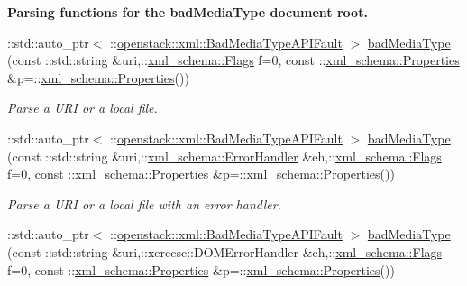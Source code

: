 \begin{Indent}{\bf Parsing functions for the badMediaType document root.}\par
\begin{DoxyCompactItemize}
\item 
::std::auto\_\-ptr$<$ ::\hyperlink{classopenstack_1_1xml_1_1BadMediaTypeAPIFault}{openstack::xml::BadMediaTypeAPIFault} $>$ \hyperlink{namespaceopenstack_1_1xml_a6fb45ce80dcf60a9d3777f4f8a61ef9e}{badMediaType} (const ::std::string \&uri,::\hyperlink{namespacexml__schema_affb4c227cbd9aa7453dd1dc5a1401943}{xml\_\-schema::Flags} f=0, const ::\hyperlink{namespacexml__schema_ad27ce19a7ee1d3b1064092648898f64c}{xml\_\-schema::Properties} \&p=::\hyperlink{namespacexml__schema_ad27ce19a7ee1d3b1064092648898f64c}{xml\_\-schema::Properties}())
\begin{DoxyCompactList}\small\item\em Parse a URI or a local file. \item\end{DoxyCompactList}\item 
::std::auto\_\-ptr$<$ ::\hyperlink{classopenstack_1_1xml_1_1BadMediaTypeAPIFault}{openstack::xml::BadMediaTypeAPIFault} $>$ \hyperlink{namespaceopenstack_1_1xml_a486186e57beb4f4dfb86215d4d5a655f}{badMediaType} (const ::std::string \&uri,::\hyperlink{namespacexml__schema_ab1c9361bfd3b404eaabf0c31eded79dc}{xml\_\-schema::ErrorHandler} \&eh,::\hyperlink{namespacexml__schema_affb4c227cbd9aa7453dd1dc5a1401943}{xml\_\-schema::Flags} f=0, const ::\hyperlink{namespacexml__schema_ad27ce19a7ee1d3b1064092648898f64c}{xml\_\-schema::Properties} \&p=::\hyperlink{namespacexml__schema_ad27ce19a7ee1d3b1064092648898f64c}{xml\_\-schema::Properties}())
\begin{DoxyCompactList}\small\item\em Parse a URI or a local file with an error handler. \item\end{DoxyCompactList}\item 
::std::auto\_\-ptr$<$ ::\hyperlink{classopenstack_1_1xml_1_1BadMediaTypeAPIFault}{openstack::xml::BadMediaTypeAPIFault} $>$ \hyperlink{namespaceopenstack_1_1xml_a4cbbf852f006e53a9bdaf116b45e9c80}{badMediaType} (const ::std::string \&uri,::xercesc::DOMErrorHandler \&eh,::\hyperlink{namespacexml__schema_affb4c227cbd9aa7453dd1dc5a1401943}{xml\_\-schema::Flags} f=0, const ::\hyperlink{namespacexml__schema_ad27ce19a7ee1d3b1064092648898f64c}{xml\_\-schema::Properties} \&p=::\hyperlink{namespacexml__schema_ad27ce19a7ee1d3b1064092648898f64c}{xml\_\-schema::Properties}())

\end{DoxyCompactItemize}
\end{Indent}
